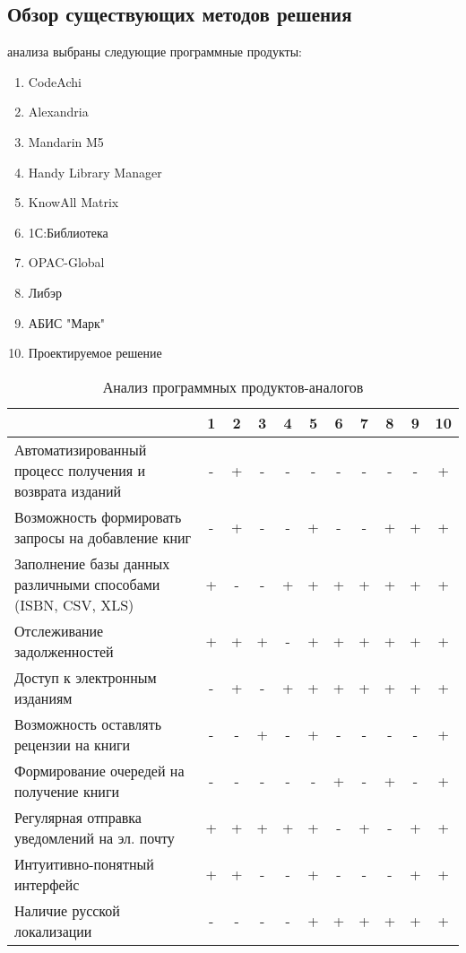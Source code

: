 \documentclass[./intro.tex]{subfiles}
\begin{document}
\subsection{Обзор существующих методов решения}
 анализа выбраны следующие программные продукты:
\begin{enumerate}
    \item CodeAchi
    \item Alexandria
    \item Mandarin M5
    \item Handy Library Manager
    \item KnowAll Matrix
    \item 1С:Библиотека
    \item OPAC-Global
    \item Либэр
    \item АБИС "Марк"
    \item Проектируемое решение
\end{enumerate}

\begin{table}[h]
    \caption{Анализ программных продуктов-аналогов}
    \label{table:1}
    \begin{tabular}{|p{8.5cm}|c|c|c|c|c|c|c|c|c|c|}
        \hline
        & 1 & 2 & 3 & 4 & 5 & 6 & 7 & 8 & 9 & 10 \\
        \hline
        Автоматизированный процесс получения и возврата изданий & - & + & - & - & - & - & - & - & - & + \\
        \hline
        Возможность формировать запросы на добавление книг & - & + & - & - & + & - & - & + & + & + \\
        \hline
        Заполнение базы данных различными способами (ISBN, CSV, XLS) & + & - & - & + & + & + & + & + & + & + \\
        \hline
        Отслеживание задолженностей & + & + & + & - & + & + & + & + & + & + \\
        \hline
        Доступ к электронным изданиям & - & + & - & + & + & + & + & + & + & + \\
        \hline
        Возможность оставлять рецензии на книги & - & - & + & - & + & - & - & - & - & + \\
        \hline
        Формирование очередей на получение книги & - & - & - & - & - & + & - & + & - & + \\
        \hline
        Регулярная отправка уведомлений на эл. почту & + & + & + & + & + & - & + & - & + & + \\
        \hline
        Интуитивно-понятный интерфейс & + & + & - & - & + & - & - & - & + & + \\
        \hline
        Наличие русской локализации & - & - & - & - & + & + & + & + & + & + \\
        \hline
    \end{tabular}    
\end{table}
\end{document}
